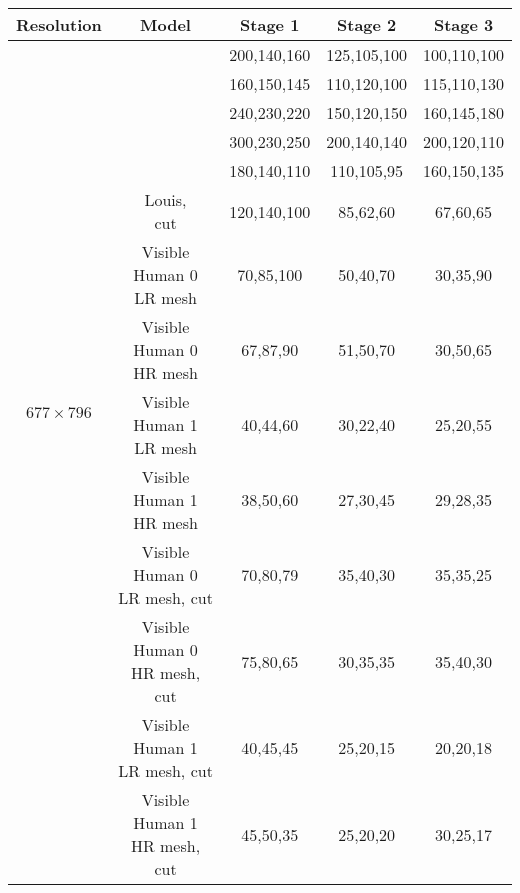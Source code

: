 \begin{tabular}{|c|c||c|c|c|}
	\hline
	Resolution & Model & Stage 1 & Stage 2 & Stage 3 \\
	\hline
	\hline
	\multirow{13}{*}[-7em]{$677\times796$} & \shortstack{Thelonious} & 200,140,160 & 125,105,100 & 100,110,100 \\\cline{2-5}
					& \shortstack{Dizzy} & 160,150,145 & 110,120,100 & 115,110,130 \\\cline{2-5}
	                                & \shortstack{Roberta} & 240,230,220 & 150,120,150 & 160,145,180 \\\cline{2-5}
	                                & \shortstack{Eartha} & 300,230,250 & 200,140,140 & 200,120,110 \\\cline{2-5}
					& \shortstack{Louis} & 180,140,110 & 110,105,95 & 160,150,135 \\\cline{2-5}
	                                & \shortstack{Louis,\\cut} & 120,140,100 & 85,62,60 & 67,60,65 \\\cline{2-5}
	                                & \shortstack{Visible\\Human 0\\LR mesh} & 70,85,100 & 50,40,70 & 30,35,90 \\\cline{2-5}
	                                & \shortstack{Visible\\Human 0\\HR mesh} & 67,87,90 & 51,50,70 & 30,50,65 \\\cline{2-5}
	                                & \shortstack{Visible\\Human 1\\LR mesh} & 40,44,60 & 30,22,40 & 25,20,55 \\\cline{2-5}
	                                & \shortstack{Visible\\Human 1\\HR mesh} & 38,50,60 & 27,30,45 & 29,28,35 \\\cline{2-5}
	                                & \shortstack{Visible\\Human 0\\LR mesh, cut} & 70,80,79 & 35,40,30 & 35,35,25 \\\cline{2-5}
	                                & \shortstack{Visible\\Human 0\\HR mesh, cut} & 75,80,65 & 30,35,35 & 35,40,30 \\\cline{2-5}
					& \shortstack{Visible\\Human 1\\LR mesh, cut} & 40,45,45 & 25,20,15 & 20,20,18 \\\cline{2-5}
					& \shortstack{Visible\\Human 1\\HR mesh, cut} & 45,50,35 & 25,20,20 & 30,25,17 \\\cline{2-5}
	\hline
\end{tabular}\\

